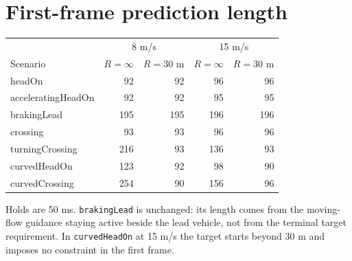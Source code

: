 \documentclass[11pt]{article}
\begin{document}
\section{First-frame prediction length}
\begin{center}
\begin{tabular}{lrrrr}
\toprule
 & \multicolumn{2}{c}{8 m/s} & \multicolumn{2}{c}{15 m/s} \\
Scenario & $R=\infty$ & $R=30$ m & $R=\infty$ & $R=30$ m \\
\midrule
headOn & 92 & 92 & 96 & 96 \\
acceleratingHeadOn & 92 & 92 & 95 & 95 \\
brakingLead & 195 & 195 & 196 & 196 \\
crossing & 93 & 93 & 96 & 96 \\
turningCrossing & 216 & 93 & 136 & 93 \\
curvedHeadOn & 123 & 92 & 98 & 90 \\
curvedCrossing & 254 & 90 & 156 & 96 \\
\bottomrule
\end{tabular}
\end{center}
Holds are 50 ms. \texttt{brakingLead} is unchanged: its length comes from the
moving-flow guidance staying active beside the lead vehicle, not from the
terminal target requirement. In \texttt{curvedHeadOn} at 15 m/s the target
starts beyond 30 m and imposes no constraint in the first frame.
\end{document}
